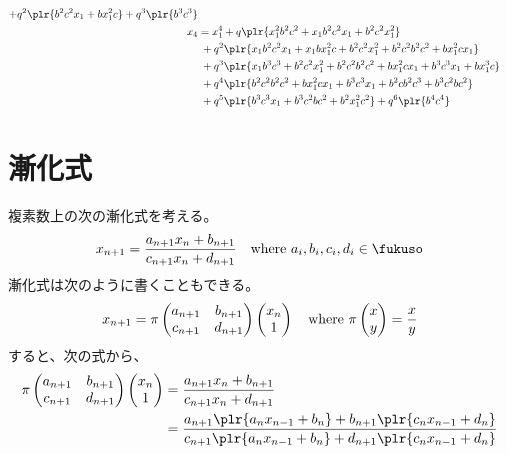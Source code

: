 {\begin{equation*}
\begin{split}
			+ q^2\plr{b^2c^2x_1 + bx_1^2c} + q^3\plr{b^3c^3} \\
		x_4 &= x_1^4 + q\plr{x_1^2b^2c^2 + x_1b^2c^2x_1 + b^2c^2x_1^2} \\
		&\;+ q^2\plr{x_1b^2c^2x_1 + x_1bx_1^2c + b^2c^2x_1^2 + b^2c^2b^2c^2 
			+ bx_1^2cx_1} \\
		&\;+ q^3\plr{x_1b^3c^3 + b^2c^2x_1^2 + b^2c^2b^2c^2 + bx_1^2cx_1 
			+ b^3c^3x_1 + bx_1^3c} \\
		&\;+ q^4\plr{b^2c^2b^2c^2 + bx_1^2cx_1 + b^3c^3x_1 + b^2cb^2c^3 
			+ b^3c^2bc^2} \\
		&\;+ q^5\plr{b^3c^3x_1 + b^3c^2bc^2 + b^2x_1^2c^2} + q^6\plr{b^4c^4}
	\end{split}\end{equation*}
\section{漸化式}\label{s1:漸化式} %
	複素数上の次の漸化式を考える。
	\begin{equation}\label{eq:一次変換の漸化式}\begin{split}
		x_{n+1} = \frac{a_{n+1}x_n + b_{n+1}}{c_{n+1}x_n + d_{n+1}}
		\quad\text{where } a_i,b_i,c_i,d_i\in\fukuso
	\end{split}\end{equation}
	漸化式は次のように書くこともできる。
	\begin{equation*}\begin{split}
		x_{n+1} = \pi\begin{pmatrix}
			a_{n+1} & b_{n+1} \\ c_{n+1} & d_{n+1} \\
		\end{pmatrix}\begin{pmatrix}{x_n}\\{1}\end{pmatrix}
		\quad\text{where } \pi\begin{pmatrix}{x}\\{y}\end{pmatrix} = \frac{x}{y}
	\end{split}\end{equation*}
	すると、次の式から、
	\begin{equation*}\begin{split}
		\pi\begin{pmatrix}
			a_{n+1} & b_{n+1} \\ c_{n+1} & d_{n+1} \\
		\end{pmatrix}\pvec{x_n}{1} 
		&= \frac{a_{n+1}x_n + b_{n+1}}{c_{n+1}x_n + d_{n+1}} \\
		&= \frac{a_{n+1}\plr{a_nx_{n-1} + b_n} + b_{n+1}\plr{c_nx_{n-1} + d_n}}
			{c_{n+1}\plr{a_nx_{n-1} + b_n} + d_{n+1}\plr{c_nx_{n-1} + d_n}} \\

\end{split}
\end{equation*}}
